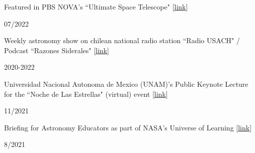 \documentclass[12pt, a4paper]{article} %
\begin{document}
\vspace{0.2cm}

\begin{minipage}[t]{0.7\textwidth}
\begin{flushleft}%
  \setlength{\leftskip}{0.2cm}%
Featured in PBS NOVA's ``Ultimate Space Telescope"  [\href{https://www.pbs.org/video/ultimate-space-telescope-gunryt/}{link}]
\end{flushleft}
\end{minipage}
\begin{minipage}[t]{0.3\textwidth}
\hfill 07/2022
\end{minipage}

\vspace{0.2cm}

\begin{minipage}[t]{0.7\textwidth}
\begin{flushleft}%
  \setlength{\leftskip}{0.2cm}%
Weekly astronomy show on chilean national radio station ``Radio USACH" / Podcast ``Razones Siderales" [\href{https://open.spotify.com/show/6sK0izR6pdByqYPt0uuoal}{link}]
\end{flushleft}
\end{minipage}
\begin{minipage}[t]{0.3\textwidth}
\hfill 2020-2022
\end{minipage}

\vspace{0.2cm}

\begin{minipage}[t]{0.7\textwidth}
\begin{flushleft}%
  \setlength{\leftskip}{0.2cm}%
Universidad Nacional Autonoma de Mexico (UNAM)'s Public Keynote Lecture for the ``Noche de Las Estrellas" (virtual) event  [\href{https://youtu.be/6wq0XPsIdOk?t=12911}{link}]
\end{flushleft}
\end{minipage}
\begin{minipage}[t]{0.3\textwidth}
\hfill 11/2021
\end{minipage}

\vspace{0.2cm}

\begin{minipage}[t]{0.7\textwidth}
\begin{flushleft}%
  \setlength{\leftskip}{0.2cm}%
Briefing for Astronomy Educators as part of NASA's Universe of Learning [\href{https://www.universe-of-learning.org/science-briefings/2021/8/12/webb-unfolding-the-universe}{link}]
\end{flushleft}
\end{minipage}
\begin{minipage}[t]{0.3\textwidth}
\hfill 8/2021
\end{minipage}
\end{document}
